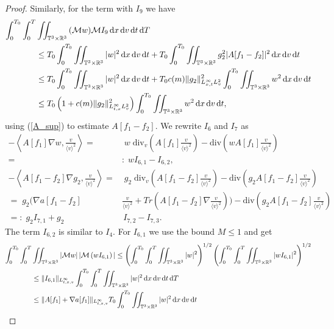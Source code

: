 \documentclass[11pt,american, reqno]{amsart}
\numberwithin{equation}{section}
\newcommand{\R}{\mathbb R}
\newcommand{\1}{\mathds{1}}
\newcommand{\dt}{\, {\rm d} t}
\newcommand{\dT}{\, {\rm d} T}
\newcommand{\dv}{\, {\rm d} v}
\newcommand{\dx}{\, {\rm d} x}
\newcommand{\CalM}{\mathcal{M}}
\newcommand{\vpran}[1]{\left(#1\right)}
\newcommand{\abs}[1]{\left\vert#1\right\vert}
\newcommand{\T}{\mathbb{T}}
\numberwithin{equation}{section}
\begin{document}
\begin{proof}
Similarly, for the term with $I_9$ we have
\begin{align*}
\int_0^{T_0}\int_0^{T} & \iint_{\T^3 \times \R^3} {({\CalM} w)  } \CalM {I_{9}} \dx\dv\dt\dT    
\\
&\le 
T_0 \int_0^{T_0} \iint_{\T^3 \times \R^3} |w| ^2 \dx\dv\dt 
+  T_0 \int_0^{T_0} \iint_{\T^3 \times \R^3}  g_2^2 | A[f_1-f_2]|^2 \dx\dv\dt 
\\
&\le 
T_0 \int_0^{T_0} \iint_{\T^3 \times \R^3} |w| ^2 \dx\dv\dt 
+  T_0 c(m) \|g_2\|^2_{L^\infty_{x,t}L_v^2} \int_0^{T_0} \iint_{\T^3 \times \R^3} w^2 \dx\dv\dt
\\
&\le T_0 \vpran{1+c(m) \|g_2\|^2_{L^\infty_{t,x}L_v^2}} \int_0^{T_0} \iint_{\T^3 \times \R^3} w^2 \dx\dv\dt,
\end{align*}
using (\ref{A_sup}) to estimate $A[f_1-f_2]$. 
We rewrite $I_6$ and $I_7$ as 
\begin{align*}
-\left  \langle A[f_1]   \nabla w ,  \frac{v}{ \langle v \rangle ^2}\right \rangle = &\;   {{w\; \textrm{div}_v\left( A[f_1] \frac{v}{ \langle v \rangle ^2}   \right)}}
- \textrm{div} \left(  w A[f_1]    \frac{v}{ \langle v \rangle ^2} \right) 
\\
=&:\; w I_{6,1}- I_{6,2},
\\
 -  \left  \langle A[f_1-f_2]   \nabla g_2 ,  \frac{v}{ \langle v \rangle ^2}\right  \rangle = &\;   {{g_2\; \textrm{div}_v\left( A[f_1-f_2] \frac{v}{ \langle v \rangle ^2}   \right)}}
- \textrm{div} \left(  g_2 A[f_1-f_2]    \frac{v}{ \langle v \rangle ^2} \right) 
\\
=\; g_2 \bigg(\nabla a [f_1-f_2] & \frac{v}{ \langle v \rangle ^2} + Tr(A[f_1-f_2] \nabla \frac{v}{ \langle v \rangle ^2})\bigg) - \textrm{div} \left(  g_2 A[f_1-f_2]    \frac{v}{ \langle v \rangle ^2} \right) 
\\
=: \;  g_2 I_{7,1} + g_2 & \, I_{7,2} -  I_{7,3}.
\end{align*}
The term $I_{6,2}$ is similar to $I_{4}$.  For $I_{6,1}$ we use the bound $ {M} \le 1$ and get
\begin{align*}
\int_0^{T_0}\int_0^{T} & \iint_{\T^3 \times \R^3} \abs{\CalM w} |{\CalM}  \vpran{w I_{6,1}}| %
\leq 
\left(\int_0^{T_0}\int_0^{T} \iint_{\T^3 \times \R^3} | w| ^2 \right)^{1/2} 
\left( \int_0^{T_0}\int_0^{T} \iint_{\T^3 \times \R^3}  |{w I_{6,1}}|^2 %
\right)^{1/2}   
\\
& \le  
\|I_{6,1}\|_{L^\infty_{t,x,v}} \int_0^{T_0}\int_0^{T} \iint_{\T^3 \times \R^3}  |w|^2 \dx\dv\dt\dT  
\\
&\le \|A[f_1] + \nabla a[f_1]\|_{L^\infty_{t,x,v}} T_0   \int_0^{T_0}\iint_{\T^3 \times \R^3}  |w| ^2 \dx\dv\dt

\end{align*}
\end{proof}
\end{document}
